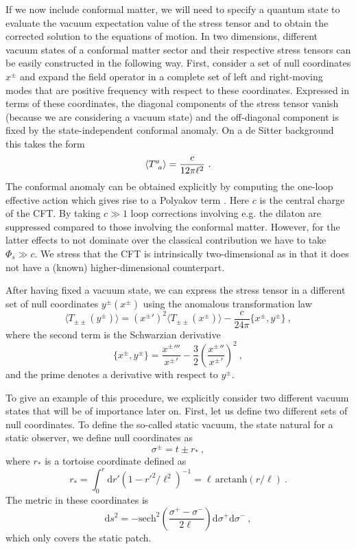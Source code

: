 \documentclass[a4paper,11pt]{article}
\newcommand{\beq}{\begin{equation}}
\newcommand{\eeq}{\end{equation}}
\newcommand{\rmd}{\mathrm{d}}
\numberwithin{equation}{section}
\begin{document}
If we now include conformal matter, we will need to specify a quantum state to evaluate the vacuum expectation value of the stress tensor and to obtain the corrected solution to the equations of motion. In two dimensions, different vacuum states of a conformal matter sector and their respective stress tensors can be easily constructed in the following way. First, consider a set of null coordinates $x^\pm$ and expand the field operator in a complete set of left and right-moving modes that are positive frequency with respect to these coordinates. Expressed in terms of these coordinates, the diagonal components of the stress tensor vanish (because we are considering a vacuum state) and the off-diagonal component is fixed by the state-independent conformal anomaly. On a de Sitter background this takes the form \cite{Candelas:1978gf}
\beq
\braket{T^a_{\,\,\,a}} = \frac{c}{12\pi\ell^2} ~.
\eeq
The conformal anomaly can be obtained explicitly by computing the one-loop effective action which gives rise to a Polyakov term \cite{Callan:1992rs}. Here $c$ is the central charge of the CFT. By taking $c\gg 1$ loop corrections involving e.g. the dilaton are suppressed compared to those involving the conformal matter\cite{Callan:1992rs}. However, for the latter effects to not dominate over the classical contribution we have to take $\Phi_s\gg c$. We stress that the CFT is intrinsically two-dimensional as in that it does not have a (known) higher-dimensional counterpart.

After having fixed a vacuum state, we can express the stress tensor in a different set of null coordinates $y^\pm(x^\pm)$ using the anomalous transformation law
\beq \label{eq:stresstrafo}
\langle T_{\pm\pm}(y^\pm)\rangle = ({x^\pm}')^2\langle T_{\pm\pm}(x^\pm)\rangle -\frac{c}{24\pi}\{x^\pm,y^\pm\} ~,
\eeq
where the second term is the Schwarzian derivative
\beq
\{x^\pm,y^\pm\} = \frac{{x^\pm}'''}{{x^\pm}'} - \frac32\left(\frac{{x^\pm}''}{{x^\pm}'}\right)^2 ~,
\eeq
and the prime denotes a derivative with respect to $y^\pm$.

To give an example of this procedure, we explicitly consider two different vacuum states that will be of importance later on. First, let us define two different sets of null coordinates. To define the so-called static vacuum, the state natural for a static observer, we define null coordinates as
\beq
\sigma^\pm = t \pm r_* ~,
\eeq
where $r_*$ is a tortoise coordinate defined as
\beq
r_* = \int_0^r\rmd r'\left(1-r'^2/\ell^2\right)^{-1} = \ell\, \text{arctanh}(r/\ell)~.
\eeq
The metric in these coordinates is
\beq
\rmd s^2 = -\text{sech}^2\left(\frac{\sigma^+-\sigma^-}{2\ell}\right)\rmd\sigma^+\rmd\sigma^- ~,
\eeq
which only covers the static patch.
\end{document}
